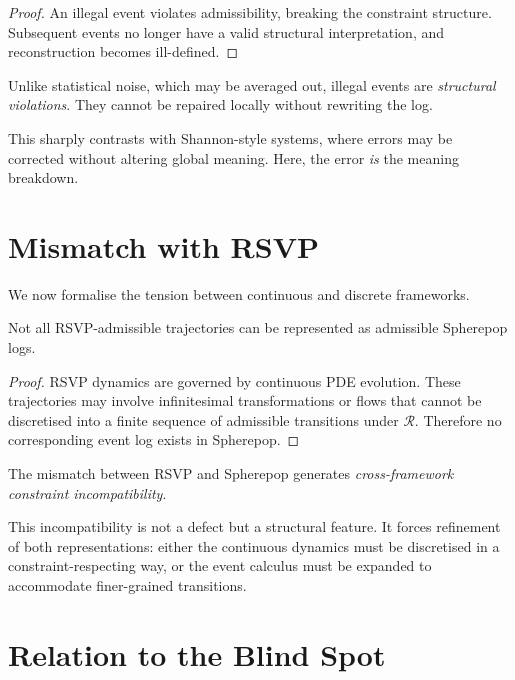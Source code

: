 \documentclass[11pt,openany]{book}
\begin{document}
\begin{proof}
An illegal event violates admissibility, breaking the
constraint structure. Subsequent events no longer have a
valid structural interpretation, and reconstruction becomes
ill-defined.
\end{proof}

\begin{remark}
Unlike statistical noise, which may be averaged out,
illegal events are \emph{structural violations}. They cannot
be repaired locally without rewriting the log.
\end{remark}

This sharply contrasts with Shannon-style systems, where
errors may be corrected without altering global meaning.
Here, the error \emph{is} the meaning breakdown.

\section{Mismatch with RSVP}
\label{sec:mismatch-rsvp}

We now formalise the tension between continuous and
discrete frameworks.

\begin{proposition}
\label{prop:mismatch}
Not all RSVP-admissible trajectories can be represented as
admissible Spherepop logs.
\end{proposition}

\begin{proof}
RSVP dynamics are governed by continuous PDE evolution.
These trajectories may involve infinitesimal transformations
or flows that cannot be discretised into a finite sequence
of admissible transitions under $\mathcal{R}$. Therefore no
corresponding event log exists in Spherepop.
\end{proof}

\begin{corollary}
The mismatch between RSVP and Spherepop generates
\emph{cross-framework constraint incompatibility}.
\end{corollary}

This incompatibility is not a defect but a structural
feature. It forces refinement of both representations:
either the continuous dynamics must be discretised in a
constraint-respecting way, or the event calculus must be
expanded to accommodate finer-grained transitions.

\section{Relation to the Blind Spot}
\label{sec:blind-spot-spherepop}
\end{document}
